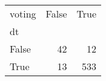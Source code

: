 \begin{tabular}{lrr}
\toprule
voting &  False &  True  \\
dt    &        &        \\
\midrule
False &     42 &     12 \\
True  &     13 &    533 \\
\bottomrule
\end{tabular}
